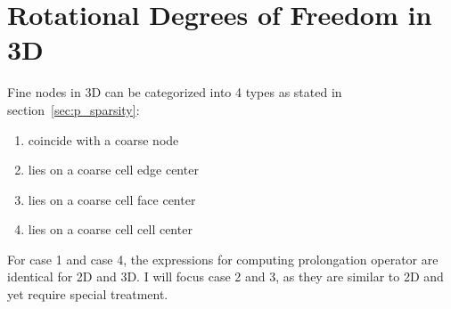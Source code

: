 \section{Rotational Degrees of Freedom in 3D}
Fine nodes in 3D can be categorized into 4 types as stated in section~\ref{sec:p_sparsity}:
\begin{enumerate}
\item coincide with a coarse node
\item lies on a coarse cell edge center
\item lies on a coarse cell face center
\item lies on a coarse cell cell center
\end{enumerate}
For case 1 and case 4, the expressions for computing prolongation operator are identical for 2D and 3D. I will focus case 2 and 3, as they are similar to 2D and yet require special treatment. 
